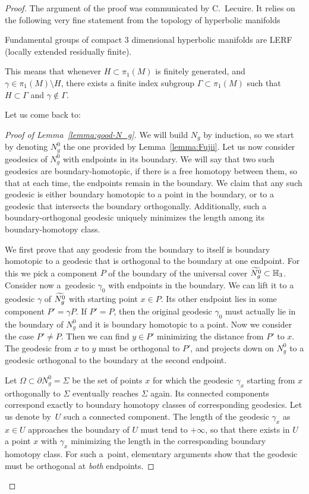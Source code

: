 \documentclass[AHL,Unicode,longabstracts,published]{cedram}
\newcommand{\Hh}{\mathbb{H}}
\theoremstyle{plain}
\let\oldtilde\tilde
\renewcommand*{\tilde}[1]{\mathchoice{\widetilde{#1}}{\widetilde{#1}}{\oldtilde{#1}}{\oldtilde{#1}}}
\begin{document}
\begin{proof}
The argument of the proof was communicated by C.~Lecuire. It relies on the following very fine statement from the topology of hyperbolic manifolds

\begin{theo}
Fundamental groups of compact 3 dimensional hyperbolic manifolds are LERF (locally extended residually finite).
\end{theo}

This means that whenever $H\subset \pi_1(M)$ is finitely generated, and $\gamma\in \pi_1(M)\setminus H$, there exists a finite index subgroup $\Gamma\subset\pi_1(M)$ such that $H\subset \Gamma$ and $\gamma\notin \Gamma$.

Let us come back to:

\begin{proof}[Proof of Lemma~\ref{lemma:good-N_g}]
We will build $N_g$ by induction, so we start by denoting $N_g^0$ the one provided by Lemma~\ref{lemma:Fujii}. Let us now consider geodesics of $N_g^0$ with endpoints in its boundary. We will say that two such geodesics are boundary-homotopic, if there is a free homotopy between them, so that at each time, the endpoints remain in the boundary. We claim that any such geodesic is either boundary homotopic to a point in the boundary, or to a geodesic that intersects the boundary orthogonally. Additionally, such a boundary-orthogonal geodesic uniquely minimizes the length among its boundary-homotopy class.

We first prove that any geodesic from the boundary to itself is boundary homotopic to a geodesic that is orthogonal to the boundary at one endpoint. For this we pick a component $P$ of the boundary of the universal cover $\tilde{N_g^0}\subset \Hh_3$. Consider now a~geodesic $\gamma_0$ with endpoints in the boundary. We can lift it to a geodesic $\gamma$ of $\tilde{N_g^0}$ with starting point $x\in P$. Its other endpoint lies in some component $P'=\gamma P$. If $P'= P$, then the original geodesic $\gamma_0$ must actually lie in the boundary of $N_g^0$ and it is boundary homotopic to a point. Now we consider the case $P'\neq P$. Then we can find $y\in P'$ minimizing the distance from $P'$ to $x$. The geodesic from $x$ to $y$ must be orthogonal to $P'$, and projects down on $N_g^0$ to a geodesic orthogonal to the boundary at the second endpoint.

Let $\Omega\subset \partial N_g^0 = \Sigma$ be the set of points $x$ for which the geodesic $\gamma_x$ starting from $x$ orthogonally to $\Sigma$ eventually reaches $\Sigma$ again. Its connected components correspond exactly to boundary homotopy classes of corresponding geodesics. Let us denote by~$U$ such a connected component. The length of the geodesic $\gamma_x$ as $x\in U$ approaches the boundary of $U$ must tend to $+\infty$, so that there exists in $U$ a point $x$ with $\gamma_x$ minimizing the length in the corresponding boundary homotopy class. For such a~point, elementary arguments show that the geodesic must be orthogonal at \emph{both} endpoints.


\end{proof}
\end{proof}
\end{document}
